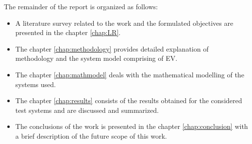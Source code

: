 	\par The remainder of the report is organized as follows:
	\begin{itemize}
		\item A literature survey related to the work and the formulated objectives are presented in the chapter \ref{chap:LR}.
		
		\item The chapter \ref{chap:methodology}  provides detailed explanation
		of methodology and the system model comprising of EV.
				
		\item The chapter \ref{chap:mathmodel} deals with the mathematical modelling of the systems used.
		
		\item The chapter  \ref{chap:results} consists of the results obtained for the considered test systems and are discussed and summarized. 
		\item The conclusions of the work is presented in the chapter \ref{chap:conclusion} with a brief description of the future scope of this work.
	\end{itemize}
